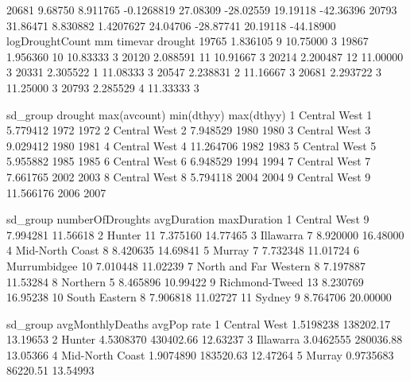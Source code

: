 \documentclass[a4paper]{article}                %
\begin{document}
\begin{Schunk}
\begin{Soutput}
20681  9.68750 8.911765   -0.1268819 27.08309 -28.02559 19.19118 -42.36396
20793 31.86471 8.830882    1.4207627 24.04706 -28.87741 20.19118 -44.18900
      logDroughtCount mm  timevar drought
19765        1.836105  9 10.75000       3
19867        1.956360 10 10.83333       3
20120        2.088591 11 10.91667       3
20214        2.200487 12 11.00000       3
20331        2.305522  1 11.08333       3
20547        2.238831  2 11.16667       3
20681        2.293722  3 11.25000       3
20793        2.285529  4 11.33333       3
\end{Soutput}
\begin{Soutput}
      sd_group drought max(avcount) min(dthyy) max(dthyy)
1 Central West       1     5.779412       1972       1972
2 Central West       2     7.948529       1980       1980
3 Central West       3     9.029412       1980       1981
4 Central West       4    11.264706       1982       1983
5 Central West       5     5.955882       1985       1985
6 Central West       6     6.948529       1994       1994
7 Central West       7     7.661765       2002       2003
8 Central West       8     5.794118       2004       2004
9 Central West       9    11.566176       2006       2007
\end{Soutput}
\begin{Soutput}
                sd_group numberOfDroughts avgDuration maxDuration
1           Central West                9    7.994281    11.56618
2                 Hunter               11    7.375160    14.77465
3              Illawarra                7    8.920000    16.48000
4        Mid-North Coast                8    8.420635    14.69841
5                 Murray                7    7.732348    11.01724
6           Murrumbidgee               10    7.010448    11.02239
7  North and Far Western                8    7.197887    11.53284
8               Northern                5    8.465896    10.99422
9         Richmond-Tweed               13    8.230769    16.95238
10         South Eastern                8    7.906818    11.02727
11                Sydney                9    8.764706    20.00000
\end{Soutput}
\begin{Soutput}
                sd_group avgMonthlyDeaths     avgPop     rate
1           Central West        1.5198238  138202.17 13.19653
2                 Hunter        4.5308370  430402.66 12.63237
3              Illawarra        3.0462555  280036.88 13.05366
4        Mid-North Coast        1.9074890  183520.63 12.47264
5                 Murray        0.9735683   86220.51 13.54993

\end{Soutput}
\end{Schunk}
\end{document}
